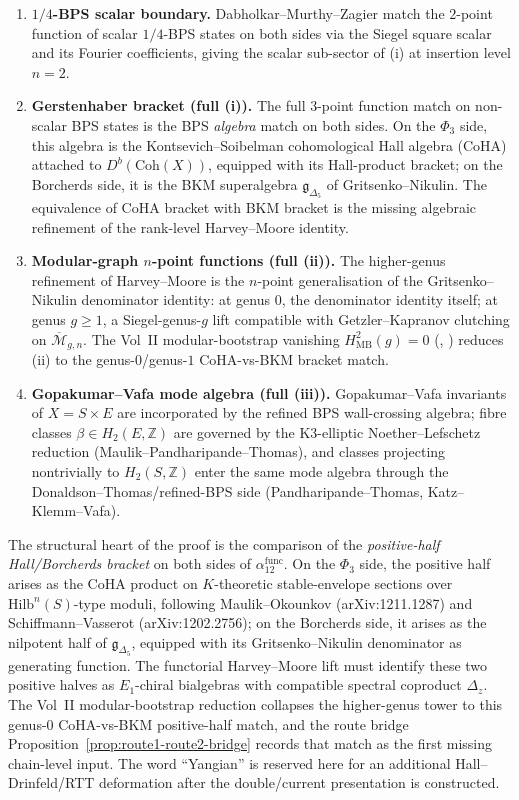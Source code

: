 \begin{theorem}
\begin{enumerate}[label=\textup{(\alph*)}]
 \item \textbf{\(1/4\)-BPS scalar boundary.} Dabholkar--Murthy--Zagier match the $2$-point function of scalar $1/4$-BPS states on both sides via the Siegel square scalar and its Fourier coefficients, giving the scalar sub-sector of (i) at insertion level $n = 2$.
\item \textbf{Gerstenhaber bracket (full (i)).} The full $3$-point function match on non-scalar BPS states is the BPS \emph{algebra} match on both sides. On the $\Phi_3$ side, this algebra is the Kontsevich--Soibelman cohomological Hall algebra (CoHA) attached to $D^b(\mathrm{Coh}(X))$, equipped with its Hall-product bracket; on the Borcherds side, it is the BKM superalgebra $\mathfrak{g}_{\Delta_5}$ of Gritsenko--Nikulin. The equivalence of CoHA bracket with BKM bracket is the missing algebraic refinement of the rank-level Harvey--Moore identity.
 \item \textbf{Modular-graph $n$-point functions (full (ii)).} The higher-genus refinement of Harvey--Moore is the $n$-point generalisation of the Gritsenko--Nikulin denominator identity: at genus $0$, the denominator identity itself; at genus $g \geq 1$, a Siegel-genus-$g$ lift compatible with Getzler--Kapranov clutching on $\overline{\mathcal{M}}_{g, n}$. The Vol~II modular-bootstrap vanishing $H^2_{\mathrm{MB}}(g) = 0$ (\cite{VolII}, \cite{VolII}) reduces (ii) to the genus-$0$/genus-$1$ CoHA-vs-BKM bracket match.
 \item \textbf{Gopakumar--Vafa mode algebra (full (iii)).} Gopakumar--Vafa invariants of $X = S \times E$ are incorporated by the refined BPS wall-crossing algebra; fibre classes $\beta \in H_2(E, \mathbb{Z})$ are governed by the K3-elliptic Noether--Lefschetz reduction (Maulik--Pandharipande--Thomas), and classes projecting nontrivially to $H_2(S, \mathbb{Z})$ enter the same mode algebra through the Donaldson--Thomas/refined-BPS side (Pandharipande--Thomas, Katz--Klemm--Vafa).
\end{enumerate}
The structural heart of the proof is the comparison of the
\emph{positive-half Hall/Borcherds bracket} on both sides of
$\alpha_{12}^{\mathrm{func}}$. On the $\Phi_3$ side, the positive half
arises as the CoHA product on $K$-theoretic stable-envelope sections over
$\mathrm{Hilb}^n(S)$-type moduli, following Maulik--Okounkov
(arXiv:1211.1287) and Schiffmann--Vasserot (arXiv:1202.2756); on the
Borcherds side, it arises as the nilpotent half of
$\mathfrak{g}_{\Delta_5}$, equipped with its Gritsenko--Nikulin
denominator as generating function. The functorial Harvey--Moore lift
must identify these two positive halves as $E_1$-chiral bialgebras with
compatible spectral coproduct $\Delta_z$. The Vol~II
modular-bootstrap reduction collapses the higher-genus tower to this
genus-$0$ CoHA-vs-BKM positive-half match, and the route bridge
Proposition~\ref{prop:route1-route2-bridge} records that match as the
first missing chain-level input. The
word ``Yangian'' is reserved here for an additional Hall--Drinfeld/RTT
deformation after the double/current presentation is constructed.
\end{theorem}

